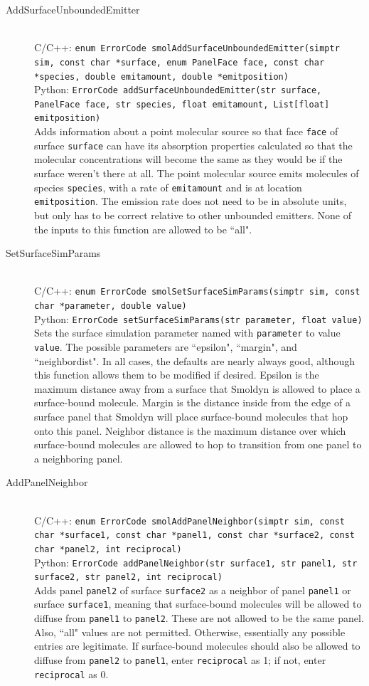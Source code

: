 \documentclass {scrbook}
\newcommand {\ttt} {\texttt}
\begin{document}
\begin{description}
\item[AddSurfaceUnboundedEmitter]
\hfill \\
C/C++: \ttt{enum ErrorCode smolAddSurfaceUnboundedEmitter(simptr sim, const char *surface, enum PanelFace face, const char *species, double emitamount, double *emitposition)}\\
Python: \ttt{ErrorCode addSurfaceUnboundedEmitter(str surface, PanelFace face, str species, float emitamount, List[float] emitposition)}\\
Adds information about a point molecular source so that face \ttt{face} of surface \ttt{surface} can have its absorption properties calculated so that the molecular concentrations will become the same as they would be if the surface weren't there at all. The point molecular source emits molecules of species \ttt{species}, with a rate of \ttt{emitamount} and is at location \ttt{emitposition}. The emission rate does not need to be in absolute units, but only has to be correct relative to other unbounded emitters. None of the inputs to this function are allowed to be ``all".

\item[SetSurfaceSimParams]
\hfill \\
C/C++: \ttt{enum ErrorCode smolSetSurfaceSimParams(simptr sim, const char *parameter, double value)}\\
Python: \ttt{ErrorCode setSurfaceSimParams(str parameter, float value)}\\
Sets the surface simulation parameter named with \ttt{parameter} to value \ttt{value}. The possible parameters are ``epsilon", ``margin", and ``neighbordist". In all cases, the defaults are nearly always good, although this function allows them to be modified if desired. Epsilon is the maximum distance away from a surface that Smoldyn is allowed to place a surface-bound molecule. Margin is the distance inside from the edge of a surface panel that Smoldyn will place surface-bound molecules that hop onto this panel. Neighbor distance is the maximum distance over which surface-bound molecules are allowed to hop to transition from one panel to a neighboring panel.

\item[AddPanelNeighbor]
\hfill \\
C/C++: \ttt{enum ErrorCode smolAddPanelNeighbor(simptr sim, const char *surface1, const char *panel1, const char *surface2, const char *panel2, int reciprocal)}\\
Python: \ttt{ErrorCode addPanelNeighbor(str surface1, str panel1, str surface2, str panel2, int reciprocal)}\\
Adds panel \ttt{panel2} of surface \ttt{surface2} as a neighbor of panel \ttt{panel1} or surface \ttt{surface1}, meaning that surface-bound molecules will be allowed to diffuse from \ttt{panel1} to \ttt{panel2}. These are not allowed to be the same panel. Also, ``all" values are not permitted. Otherwise, essentially any possible entries are legitimate. If surface-bound molecules should also be allowed to diffuse from \ttt{panel2} to \ttt{panel1}, enter \ttt{reciprocal} as 1; if not, enter \ttt{reciprocal} as 0.


\end{description}
\end{document}
